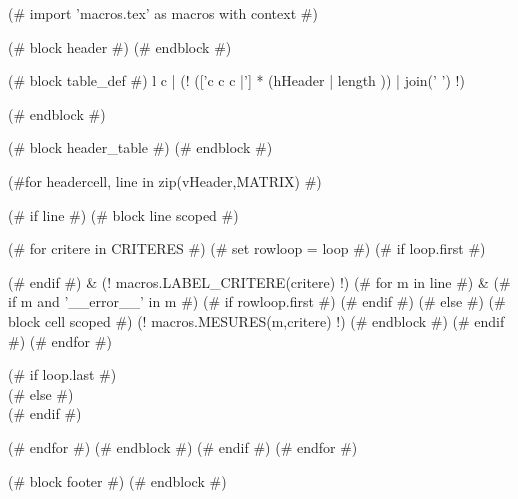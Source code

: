 (# import 'macros.tex' as macros with context #)

(# block header #)
(# endblock #)


\setlength\tabcolsep{0.07cm}
\begin{longtable}
    (# block table_def #){ l c | (! (['c c c |'] *  (hHeader | length )) | join(' ') !) }
    (# endblock #)



    (# block header_table #)
    (# endblock #)


    \endfirsthead
    \endhead
    \endfoot
    \endlastfoot

    (#for headercell, line in zip(vHeader,MATRIX) #)

    (# if line #)
    \hline
    (# block line scoped #)

    (# for critere in CRITERES #)
    (# set rowloop = loop #)
    (# if loop.first #)


    (# endif #)
    & (! macros.LABEL_CRITERE(critere) !)
    (# for m in line #)
    &
    (# if m and '__error__' in m #)
    (# if rowloop.first #)  (# endif #)
    (# else #)
    (# block cell scoped #)
    (! macros.MESURES(m,critere) !)
    (# endblock #)
    (# endif #)
    (# endfor #)

    (# if loop.last #) \\ (# else #) \\* (# endif #)

    (# endfor #)
    (# endblock #)
    (# endif #)
    (# endfor #)
    \hline
    \caption{\textbf{(! title !)}. (! description !)}
    \label{tab:(! label !)}
\end{longtable}


(# block footer #)
(# endblock #)

